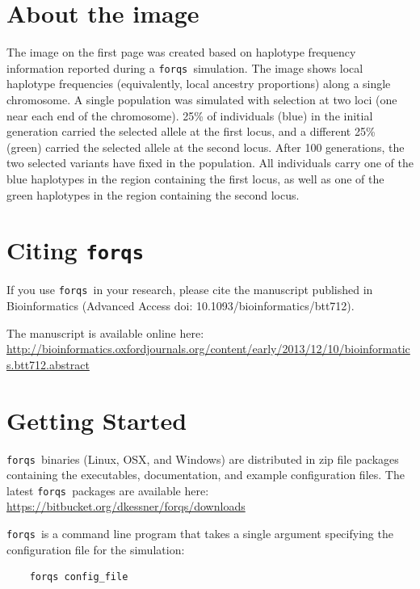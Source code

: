 \documentclass{article}
\newcommand{\forqs}[0]{\texttt{forqs }}
\begin{document}
\section*{About the image}

The image on the first page was created based on haplotype frequency
information reported during a \forqs simulation.  The image shows local
haplotype frequencies (equivalently, local ancestry proportions) along a single
chromosome.  A single population was simulated with selection at two loci (one
near each end of the chromosome).  25\% of individuals (blue) in the initial
generation carried the selected allele at the first locus, and a different 25\%
(green) carried the selected allele at the second locus.  After 100
generations, the two selected variants have fixed in the population.  All
individuals carry one of the blue haplotypes in the region containing the first
locus, as well as one of the green haplotypes in the region containing the
second locus.


\tableofcontents

\section{Citing \forqs}

If you use \forqs in your research, please cite the manuscript published in Bioinformatics
(Advanced Access doi: 10.1093/bioinformatics/btt712).

The manuscript is available online here: \\
\url{http://bioinformatics.oxfordjournals.org/content/early/2013/12/10/bioinformatics.btt712.abstract}


\newpage

\section{Getting Started}

\forqs binaries (Linux, OSX, and Windows) are distributed in zip file packages
containing the executables, documentation, and example configuration files.
The latest \forqs packages are available here:\\ 

\indent
\url{https://bitbucket.org/dkessner/forqs/downloads}

\bigskip

\forqs is a command line program that takes a single argument specifying
the configuration file for the simulation:
\begin{small}
\begin{verbatim}
    forqs config_file
\end{verbatim}
\end{small}
\end{document}
